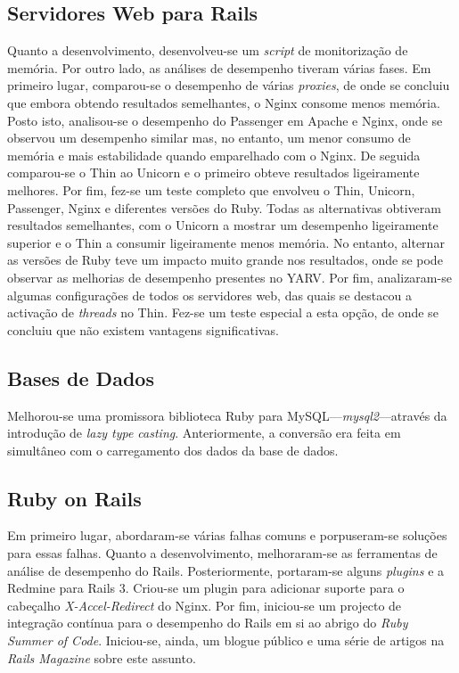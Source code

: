 \documentclass[9pt,a4paper]{extarticle}
\begin{document}
\begin{multicols}{2}
\subsection{Servidores Web para Rails}
Quanto a desenvolvimento, desenvolveu-se um \textit{script} de monitorização de memória. Por outro lado, as análises de desempenho tiveram várias fases. Em primeiro lugar, comparou-se o desempenho de várias \textit{proxies}, de onde se concluiu que embora obtendo resultados semelhantes, o Nginx consome menos memória. Posto isto, analisou-se o desempenho do Passenger em Apache e Nginx, onde se observou um desempenho similar mas, no entanto, um menor consumo de memória e mais estabilidade quando emparelhado com o Nginx. De seguida comparou-se o Thin ao Unicorn e o primeiro obteve resultados ligeiramente melhores. Por fim, fez-se um teste completo que envolveu o Thin, Unicorn, Passenger, Nginx e diferentes versões do Ruby. Todas as alternativas obtiveram resultados semelhantes, com o Unicorn a mostrar um desempenho ligeiramente superior e o Thin a consumir ligeiramente menos memória. No entanto, alternar as versões de Ruby teve um impacto muito grande nos resultados, onde se pode observar as melhorias de desempenho presentes no YARV. Por fim, analizaram-se algumas configurações de todos os servidores web, das quais se destacou a activação de \textit{threads} no Thin. Fez-se um teste especial a esta opção, de onde se concluiu que não existem vantagens significativas.


\subsection{Bases de Dados}
Melhorou-se uma promissora biblioteca Ruby para MySQL---\textit{mysql2}---através da introdução de \textit{lazy type casting}. Anteriormente, a conversão era feita em simultâneo com o carregamento dos dados da base de dados.


\subsection{Ruby on Rails}
Em primeiro lugar, abordaram-se várias falhas comuns e porpuseram-se soluções para essas falhas. Quanto a desenvolvimento, melhoraram-se as ferramentas de análise de desempenho do Rails. Posteriormente, portaram-se alguns \textit{plugins} e a Redmine para Rails 3. Criou-se um plugin para adicionar suporte para o cabeçalho \textit{X-Accel-Redirect} do Nginx. Por fim, iniciou-se um projecto de integração contínua para o desempenho do Rails em si ao abrigo do \textit{Ruby Summer of Code}. Iniciou-se, ainda, um blogue público e uma série de artigos na \textit{Rails Magazine} sobre este assunto.



\end{multicols}
\end{document}
